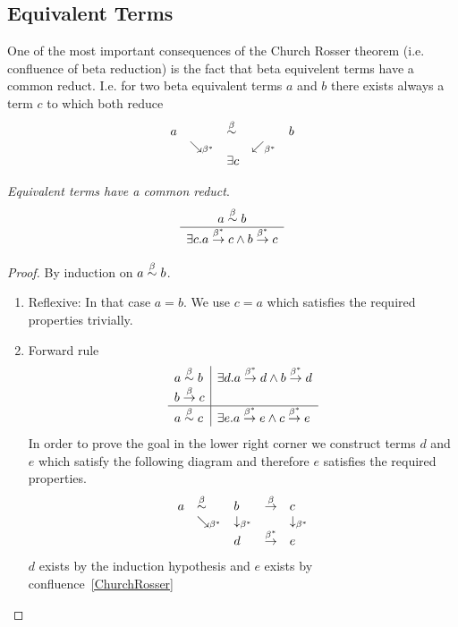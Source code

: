 \subsection{Equivalent Terms}

One of the most important consequences of the Church Rosser theorem (i.e.
confluence of beta reduction) is the fact that beta equivelent terms have a
common reduct. I.e. for two beta equivalent terms $a$ and $b$ there exists
always a term $c$ to which both reduce
$$
    \begin{array}{lllll}
    a & & \stackrel{\beta}{\sim} & & b
    \\
    &\searrow_{\beta^*}
    &
    &\swarrow_{\beta^*}
    \\
    & & \exists c
    \end{array}
$$

\begin{theorem}
    \label{BetaEquivalentCommonReduct}
    \emph{Equivalent terms have a common reduct}.
    $$
    \begin{array}{c} 
        a \stackrel{\beta}{\sim} b
     \\ \hline 
        \exists c. a \stackrel{\beta^*}{\to} c \land b \stackrel{\beta^*}{\to} c
    \end{array}
    $$

    \begin{proof}
        By induction on $a \stackrel{\beta}{\sim} b$.
        \begin{enumerate}
            \item Reflexive: In that case $a = b$. We use $c = a$ which satisfies
            the required properties trivially.

            \item Forward rule
            $$
            \begin{array}{l|l}
                a \stackrel{\beta}{\sim} b
                &
                \exists d. a \stackrel{\beta^*}{\to} d \land b \stackrel{\beta^*}{\to} d
                \\
                b \stackrel{\beta}{\to} c
                \\
                \hline
                a \stackrel{\beta}{\sim} c
                &
                \exists e. a \stackrel{\beta^*}{\to} e \land c \stackrel{\beta^*}{\to} e
            \end{array}
            $$
            In order to prove the goal in the lower right corner we construct
            terms $d$ and $e$ which satisfy the following diagram and therefore
            $e$ satisfies the required properties.
            $$
            \begin{array}{lllll}
                a
                &\stackrel{\beta}{\sim}
                &b
                &\stackrel{\beta}{\to}
                &c
                \\
                &\searrow_{\beta^*}
                &\downarrow_{\beta^*}
                &
                &\downarrow_{\beta^*}
                \\
                &
                &d
                &\stackrel{\beta^*}{\to}
                &e
            \end{array}
            $$
            $d$ exists by the induction hypothesis and $e$ exists by
            confluence~\ref{ChurchRosser}


\end{enumerate}
\end{proof}
\end{theorem}
